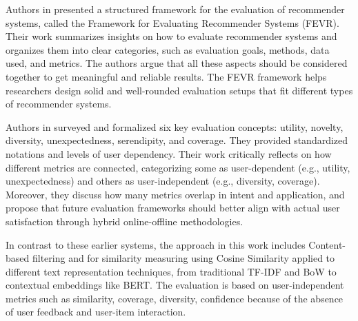 \documentclass[\myFontSize,a4paper,oneside,hidelinks]{article}
\begin{document}
Authors in \cite{Zangerle2023} presented a structured framework for the evaluation of recommender systems, called the Framework for Evaluating Recommender Systems (FEVR). 
Their work summarizes insights on how to evaluate recommender systems and organizes them into clear categories, such as evaluation goals, methods, data used, and metrics. The authors argue that all these aspects should be considered together to get meaningful and reliable results. The FEVR framework helps researchers design solid and well-rounded evaluation setups that fit different types of recommender systems.

Authors in \cite{Silveira2019813} surveyed and formalized six key evaluation concepts: utility, novelty, diversity, unexpectedness, serendipity, and coverage. They provided standardized notations and levels of user dependency. Their work critically reflects on how different metrics are connected, categorizing some as user-dependent (e.g., utility, unexpectedness) and others as user-independent (e.g., diversity, coverage). Moreover, they discuss how many metrics overlap in intent and application, and propose that future evaluation frameworks should better align with actual user satisfaction through hybrid online-offline methodologies.

In contrast to these earlier systems, the approach in this work includes Content-based filtering and for similarity measuring using Cosine Similarity applied to different text representation techniques, from traditional TF-IDF and BoW to contextual embeddings like BERT. The evaluation is based on user-independent metrics such as similarity, coverage, diversity, confidence because of the absence of user feedback and user-item interaction. 



\end{document}
